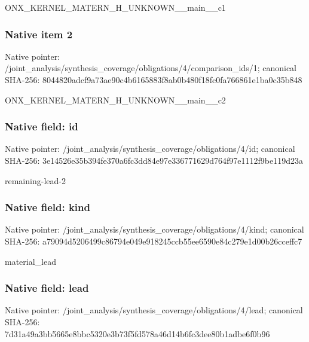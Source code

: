 \documentclass[10pt,a4paper]{article}
\begin{document}
\begingroup\raggedright\sloppy ONX\_\allowbreak{}KERNEL\_\allowbreak{}MATERN\_\allowbreak{}H\_\allowbreak{}UNKNOWN\_\allowbreak{}\_\allowbreak{}main\_\allowbreak{}\_\allowbreak{}c1\par\endgroup

\subsubsection{Native item 2}
Native pointer: /joint\_\allowbreak{}analysis/synthesis\_\allowbreak{}coverage/obligations/4/comparison\_\allowbreak{}ids/1; canonical SHA-256: 8044820adcf9a73ae90c4b6165883f8ab0b480f18fc0fa766861e1ba0c35b848

\begingroup\raggedright\sloppy ONX\_\allowbreak{}KERNEL\_\allowbreak{}MATERN\_\allowbreak{}H\_\allowbreak{}UNKNOWN\_\allowbreak{}\_\allowbreak{}main\_\allowbreak{}\_\allowbreak{}c2\par\endgroup

\subsubsection{Native field: id}
Native pointer: /joint\_\allowbreak{}analysis/synthesis\_\allowbreak{}coverage/obligations/4/id; canonical SHA-256: 3e14526e35b394fe370a6fc3dd84e97e336771629d764f97e1112f9be119d23a

\begingroup\raggedright\sloppy remaining-lead-2\par\endgroup

\subsubsection{Native field: kind}
Native pointer: /joint\_\allowbreak{}analysis/synthesis\_\allowbreak{}coverage/obligations/4/kind; canonical SHA-256: a79094d5206499c86794e049e918245ccb55ee6590e84c279e1d00b26cceffc7

\begingroup\raggedright\sloppy material\_\allowbreak{}lead\par\endgroup

\subsubsection{Native field: lead}
Native pointer: /joint\_\allowbreak{}analysis/synthesis\_\allowbreak{}coverage/obligations/4/lead; canonical SHA-256: 7d31a49a3bb5665e8bbc5320e3b73f5fd578a46d14b6fc3dee80b1adbe6f0b96
\end{document}

